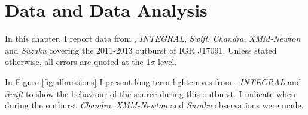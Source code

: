 \section{Data and Data Analysis}

\label{sec:dex}

\par In this chapter, I report data from \rxte , \textit{INTEGRAL}, \textit{Swift}, \textit{Chandra}, \textit{XMM-Newton} and \textit{Suzaku} covering the 2011-2013 outburst of IGR J17091.  Unless stated otherwise, all errors are quoted at the 1$\sigma$ level.
\par In Figure \ref{fig:allmissions} I present long-term lightcurves from \rxte ,  \textit{INTEGRAL} and \textit{Swift} to show the behaviour of the source during this outburst.  I indicate when during the outburst \textit{Chandra}, \textit{XMM-Newton} and \textit{Suzaku} observations were made.

